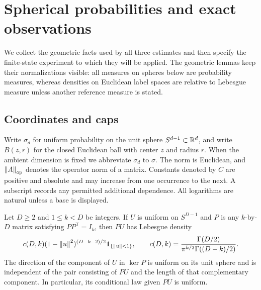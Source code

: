 \section{Spherical probabilities and exact observations}
\label{p:geometry-model}

We collect the geometric facts used by all three estimates and then specify
the finite-state experiment to which they will be applied. The geometric
lemmas keep their normalizations visible: all measures on spheres below are
probability measures, whereas densities on Euclidean label spaces are
relative to Lebesgue measure unless another reference measure is stated.

\subsection{Coordinates and caps}

Write \(\sigma_d\) for uniform probability on the unit sphere
\(S^{d-1}\subset\mathbb R^d\), and write \(B(z,r)\) for the closed Euclidean ball
with center \(z\) and radius \(r\). When the ambient dimension is fixed we
abbreviate \(\sigma_d\) to \(\sigma\). The norm is Euclidean, and
\(\left\lVert A\right\rVert_{\mathrm{op}}\) denotes the operator norm of a matrix. Constants denoted
by \(C\) are positive and absolute and may increase from one occurrence to
the next. A subscript records any permitted additional dependence.
All logarithms are natural unless a base is displayed.

\begin{lemma}\label{p:coordinate-density}
Let \(D\ge2\) and \(1\le k<D\) be integers. If \(U\) is uniform on
\(S^{D-1}\) and \(P\) is any \(k\)-by-\(D\) matrix satisfying
\(PP^{\mathsf T}=I_k\), then \(PU\) has Lebesgue density
\begin{equation}\label{p:coordinate-formula}
 c(D,k)(1-\left\lVert u\right\rVert^2)^{(D-k-2)/2}\mathbf 1_{\{\left\lVert u\right\rVert<1\}},
 \qquad
 c(D,k)=\frac{\Gamma(D/2)}
 {\pi^{k/2}\Gamma((D-k)/2)}.
\end{equation}
The direction of the component of \(U\) in \(\ker P\) is uniform on its
unit sphere and is independent of the pair consisting of \(PU\) and the
length of that complementary component. In particular, its conditional
law given \(PU\) is uniform.
\end{lemma}

